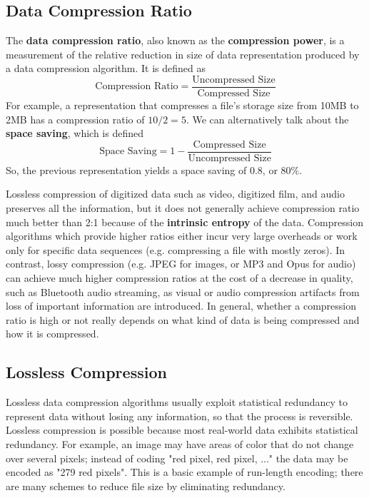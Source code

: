     \subsection{Data Compression Ratio}
    The \textbf{data compression ratio}, also known as the \textbf{compression power}, is a measurement of the relative reduction in size of data representation produced by a data compression algorithm. It is defined as 
    \begin{equation}
      \text{Compression Ratio} = \frac{\text{Uncompressed Size}}{\text{Compressed Size}}
    \end{equation}
    For example, a representation that compresses a file's storage size from 10MB to 2MB has a compression ratio of $10/2 = 5$. We can alternatively talk about the \textbf{space saving}, which is defined
    \begin{equation}
      \text{Space Saving} = 1 - \frac{\text{Compressed Size}}{\text{Uncompressed Size}}
    \end{equation}
    So, the previous representation yields a space saving of 0.8, or $80\%$. 

    Lossless compression of digitized data such as video, digitized film, and audio preserves all the information, but it does not generally achieve compression ratio much better than 2:1 because of the \textbf{intrinsic entropy} of the data. Compression algorithms which provide higher ratios either incur very large overheads or work only for specific data sequences (e.g. compressing a file with mostly zeros). In contrast, lossy compression (e.g. JPEG for images, or MP3 and Opus for audio) can achieve much higher compression ratios at the cost of a decrease in quality, such as Bluetooth audio streaming, as visual or audio compression artifacts from loss of important information are introduced. In general, whether a compression ratio is high or not really depends on what kind of data is being compressed and how it is compressed. 


    \subsection{Lossless Compression}
    Lossless data compression algorithms usually exploit statistical redundancy to represent data without losing any information, so that the process is reversible. Lossless compression is possible because most real-world data exhibits statistical redundancy. For example, an image may have areas of color that do not change over several pixels; instead of coding "red pixel, red pixel, ..." the data may be encoded as "279 red pixels". This is a basic example of run-length encoding; there are many schemes to reduce file size by eliminating redundancy.


